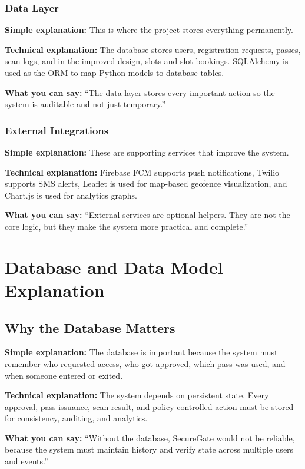 \documentclass[12pt,letterpaper]{article}
\newcommand{\simple}[1]{\textbf{Simple explanation:} #1}
\newcommand{\technical}[1]{\textbf{Technical explanation:} #1}
\newcommand{\say}[1]{\textbf{What you can say:} ``#1''}
\begin{document}
\subsubsection{Data Layer}

\simple{This is where the project stores everything permanently.}

\technical{The database stores users, registration requests, passes, scan logs, and in the improved design, slots and slot bookings. SQLAlchemy is used as the ORM to map Python models to database tables.}

\say{The data layer stores every important action so the system is auditable and not just temporary.}

\subsubsection{External Integrations}

\simple{These are supporting services that improve the system.}

\technical{Firebase FCM supports push notifications, Twilio supports SMS alerts, Leaflet is used for map-based geofence visualization, and Chart.js is used for analytics graphs.}

\say{External services are optional helpers. They are not the core logic, but they make the system more practical and complete.}

\section{Database and Data Model Explanation}

\subsection{Why the Database Matters}

\simple{The database is important because the system must remember who requested access, who got approved, which pass was used, and when someone entered or exited.}

\technical{The system depends on persistent state. Every approval, pass issuance, scan result, and policy-controlled action must be stored for consistency, auditing, and analytics.}

\say{Without the database, SecureGate would not be reliable, because the system must maintain history and verify state across multiple users and events.}
\end{document}
